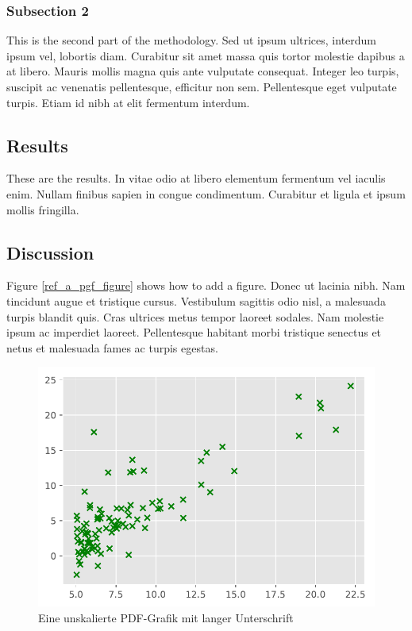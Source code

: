 \hypertarget{subsection-2-1}{%
\subsubsection{Subsection 2}\label{subsection-2-1}}

This is the second part of the methodology. Sed ut ipsum ultrices,
interdum ipsum vel, lobortis diam. Curabitur sit amet massa quis
tortor molestie dapibus a at libero. Mauris mollis magna quis ante
vulputate consequat. Integer leo turpis, suscipit ac venenatis
pellentesque, efficitur non sem. Pellentesque eget vulputate turpis.
Etiam id nibh at elit fermentum interdum.

\hypertarget{results-1}{%
\subsection{Results}\label{results-1}}

These are the results. In vitae odio at libero elementum fermentum
vel iaculis enim. Nullam finibus sapien in congue condimentum.
Curabitur et ligula et ipsum mollis fringilla.

\hypertarget{discussion-1}{%
\subsection{Discussion}\label{discussion-1}}

Figure \ref{ref_a_pgf_figure} shows how to add a figure. Donec ut
lacinia nibh. Nam tincidunt augue et tristique cursus. Vestibulum
sagittis odio nisl, a malesuada turpis blandit quis. Cras ultrices
metus tempor laoreet sodales. Nam molestie ipsum ac imperdiet
laoreet. Pellentesque habitant morbi tristique senectus et netus et
malesuada fames ac turpis egestas.

\begin{figure}[htbp]
\hypertarget{ref_a_pdf_figure}{%
\centering
\includegraphics{assets/ex1_food_truck_profit.pdf}
\caption[Eine unskalierte PDF-Grafik]{Eine unskalierte PDF-Grafik mit langer Unterschrift
\autocite[vgl.][13]{Perez_PythonEcosystem_2011}}\label{ref_a_pdf_figure}
}
\end{figure}

